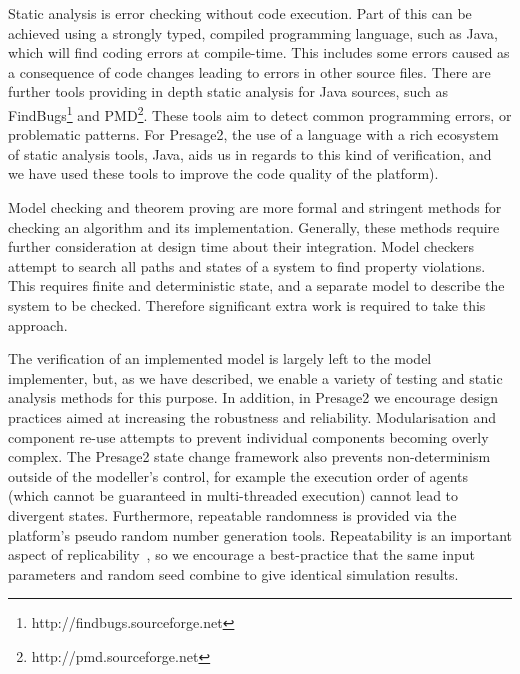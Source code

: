 Static analysis is error checking without code execution. Part of this can be
achieved using a strongly typed, compiled programming language, such as Java,
which will find coding errors at compile-time. This includes some errors
caused as a consequence of code changes leading to errors in other source
files. There are further tools providing in depth static analysis for Java
sources, such as FindBugs\footnote{http://findbugs.sourceforge.net} and
PMD\footnote{http://pmd.sourceforge.net}. These tools aim to detect common
programming errors, or problematic patterns. For Presage2, the use of a
language with a rich ecosystem of static analysis tools, Java, aids us in
regards to this kind of verification, and we have used these tools to improve the code quality of the platform).

Model checking and theorem proving are more formal and stringent methods for
checking an algorithm and its implementation. Generally, these methods require
further consideration at design time about their integration. Model
checkers attempt to search all paths and states of a system to find property
violations. This requires finite and deterministic state, and a separate model
to describe the system to be checked. Therefore significant extra work is
required to take this approach.

The verification of an implemented model is largely left to the
model implementer, but, as we have described, we enable a variety of testing and static analysis methods for this purpose. 
In
addition, in Presage2 we encourage design practices aimed at increasing the
robustness and reliability. Modularisation and component re-use attempts to
prevent individual components becoming overly complex. The Presage2 state
change framework also prevents non-determinism outside of the modeller's
control, for example the execution order of agents (which cannot be guaranteed
in multi-threaded execution) cannot lead to divergent states. Furthermore,
repeatable randomness is provided via the platform's pseudo random
number generation tools. Repeatability is an important aspect of
replicability~\citep{Axelrod1997,Ormerod2009}, so we encourage a best-practice
that the same input parameters and random seed combine to give identical
simulation results.


